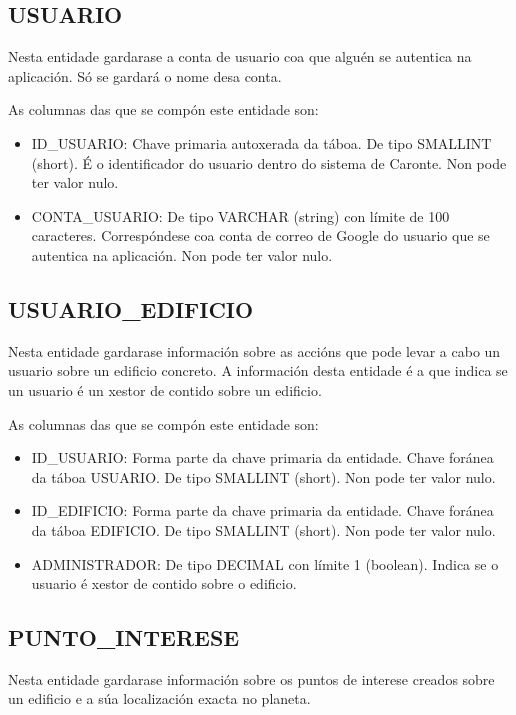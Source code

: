 \subsection{USUARIO}
Nesta entidade gardarase a conta de usuario coa que alguén se autentica na aplicación. Só se gardará o nome desa conta.

As columnas das que se compón este entidade son:
\begin{itemize}
	\item ID\_USUARIO: Chave primaria autoxerada da táboa. De tipo SMALLINT (short). É o identificador do usuario dentro do sistema de Caronte. Non pode ter valor nulo.
	\item CONTA\_USUARIO: De tipo VARCHAR (string) con límite de 100 caracteres. Correspóndese coa conta de correo de Google do usuario que se autentica na aplicación. Non pode ter valor nulo.
\end{itemize}

\subsection{USUARIO\_EDIFICIO}
Nesta entidade gardarase información sobre as accións que pode levar a cabo un usuario sobre un edificio concreto. A información desta entidade é a que indica se un usuario é un xestor de contido sobre un edificio.

As columnas das que se compón este entidade son:
\begin{itemize}
	\item ID\_USUARIO: Forma parte da chave primaria da entidade. Chave foránea da táboa USUARIO. De tipo SMALLINT (short). Non pode ter valor nulo.
	\item ID\_EDIFICIO: Forma parte da chave primaria da entidade. Chave foránea da táboa EDIFICIO. De tipo SMALLINT (short). Non pode ter valor nulo.
	\item ADMINISTRADOR: De tipo DECIMAL con límite 1 (boolean). Indica se o usuario é xestor de contido sobre o edificio.
\end{itemize}


\subsection{PUNTO\_INTERESE}
Nesta entidade gardarase información sobre os puntos de interese creados sobre un edificio e a súa localización exacta no planeta.

